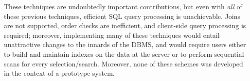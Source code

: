 

These techniques are undoubtedly important contributions, but even
with {\em all} of these previous techniques, efficient SQL query
processing is unachievable.  Joins are not supported, order checks are
inefficient, and client-side query processing is required; moreover,
implementing many of these techniques would entail unattractive
changes to the innards of the DBMS, and would require users either to
build and maintain indexes on the data at the server or to perform
sequential scans for every selection/search.  Moreover, none of these
schemes was developed in the context of a prototype system.





